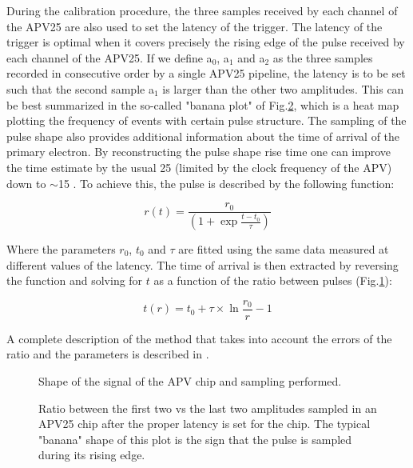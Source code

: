 During the calibration procedure, the three samples received by each channel of the APV25 are also used to set the latency of the trigger. The latency of the trigger is optimal when it covers precisely the rising edge of the pulse received by each channel of the APV25. If we define a$_0$, a$_1$ and a$_2$ as the three samples recorded in consecutive order by a single APV25 pipeline, the latency is to be set such that the second sample a$_1$ is larger than the other two amplitudes. This can be best summarized in the so-called "banana plot" of Fig.\ref{fig:banana-plot}, which is a heat map plotting the frequency of events with certain pulse structure. The sampling of the pulse shape also provides additional information about the time of arrival of the primary electron. By reconstructing the pulse shape rise time one can improve the time estimate by the usual 25 \nas (limited by the clock frequency of the APV) down to $\sim$15 \nas \cite{Banerjee:2017mdu}. To achieve this, the pulse is described by the following function:

\begin{equation}
\label{eq:apv-pulse}
r(t) = \frac{r_0}{(1 + \exp{\frac{t-t_0}{\tau}})}
\end{equation}

Where the parameters $r_0$, $t_0$ and $\tau$ are fitted using the same data measured at different values of the latency. The time of arrival is then extracted by reversing the function and solving for $t$ as a function of the ratio between pulses (Fig.\ref{fig:apv-signal-shape}):

\begin{equation}
\label{eq:2}
t(r) = t_0 + \tau \times \ln{\frac{r_0}{r} - 1}
\end{equation}

A complete description of the method that takes into account the errors of the ratio and the parameters is described in \cite{dbanerjee-thesis}.


\begin{figure}[bth!]
\centering
\caption[apv signal shape]{Shape of the signal of the APV chip and sampling performed.}
\label{fig:apv-signal-shape}
\end{figure}

\begin{figure}[!bth]
\centering
\caption[APV25 banana plot]{Ratio between the first two vs the last two amplitudes sampled in an APV25 chip after the proper latency is set for the chip. The typical "banana" shape of this plot is the sign that the pulse is sampled during its rising edge.}
\label{fig:banana-plot}
\end{figure}

